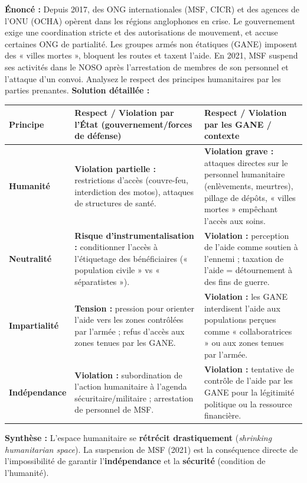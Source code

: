 \documentclass[11pt]{article}
\begin{document}
\begin{exoresolu}
\textbf{Énoncé :} Depuis 2017, des ONG internationales (MSF, CICR) et des agences de l'ONU (OCHA) opèrent dans les régions anglophones en crise. Le gouvernement exige une coordination stricte et des autorisations de mouvement, et accuse certaines ONG de partialité. Les groupes armés non étatiques (GANE) imposent des « villes mortes », bloquent les routes et taxent l'aide. En 2021, MSF suspend ses activités dans le NOSO après l'arrestation de membres de son personnel et l'attaque d'un convoi. Analysez le respect des principes humanitaires par les parties prenantes.
\tcblower
\textbf{Solution détaillée :}
\begin{center}
\begin{tabularx}{\linewidth}{|l|X|X|}
\hline
\textbf{Principe} & \textbf{Respect / Violation par l'État (gouvernement/forces de défense)} & \textbf{Respect / Violation par les GANE / contexte} \\
\hline
\textbf{Humanité} & \textbf{Violation partielle :} restrictions d'accès (couvre-feu, interdiction des motos), attaques de structures de santé. & \textbf{Violation grave :} attaques directes sur le personnel humanitaire (enlèvements, meurtres), pillage de dépôts, « villes mortes » empêchant l'accès aux soins. \\
\hline
\textbf{Neutralité} & \textbf{Risque d'instrumentalisation :} conditionner l'accès à l'étiquetage des bénéficiaires (« population civile » vs « séparatistes »). & \textbf{Violation :} perception de l'aide comme soutien à l'ennemi ; taxation de l'aide = détournement à des fins de guerre. \\
\hline
\textbf{Impartialité} & \textbf{Tension :} pression pour orienter l'aide vers les zones contrôlées par l'armée ; refus d'accès aux zones tenues par les GANE. & \textbf{Violation :} les GANE interdisent l'aide aux populations perçues comme « collaboratrices » ou aux zones tenues par l'armée. \\
\hline
\textbf{Indépendance} & \textbf{Violation :} subordination de l'action humanitaire à l'agenda sécuritaire/militaire ; arrestation de personnel de MSF. & \textbf{Violation :} tentative de contrôle de l'aide par les GANE pour la légitimité politique ou la ressource financière. \\
\hline
\end{tabularx}
\end{center}
\textbf{Synthèse :} L'espace humanitaire se \textbf{rétrécit drastiquement} (\emph{shrinking humanitarian space}). La suspension de MSF (2021) est la conséquence directe de l'impossibilité de garantir l'\textbf{indépendance} et la \textbf{sécurité} (condition de l'humanité).

\end{exoresolu}
\end{document}
